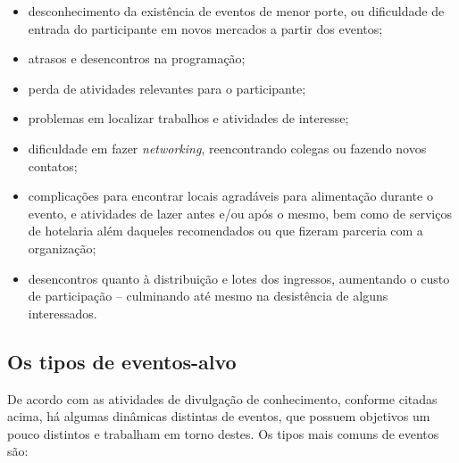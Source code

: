 \documentclass[12pt,a4paper,twoside,hyphens,english,brazil]{abntex2}
\begin{document}
\begin{itemize}[itemsep=-1ex]
	\item desconhecimento da existência de eventos de menor porte, ou dificuldade de entrada do participante em novos mercados a partir dos eventos;
	\item atrasos e desencontros na programação;
	\item perda de atividades relevantes para o participante;
	\item problemas em localizar trabalhos e atividades de interesse;
	\item dificuldade em fazer \emph{networking}, reencontrando colegas ou fazendo novos contatos;
	\item complicações para encontrar locais agradáveis para alimentação durante o evento, e atividades de lazer antes e/ou após o mesmo, bem como de serviços de hotelaria além daqueles recomendados ou que fizeram parceria com a organização;
	\item desencontros quanto \`a distribuição e lotes dos ingressos, aumentando o custo de participação -- culminando até mesmo na desistência de alguns interessados.
\end{itemize}

\subsection{Os tipos de eventos-alvo} \label{sec:eventos}
De acordo com as atividades de divulgação de conhecimento, conforme citadas acima, há algumas dinâmicas distintas de eventos, que possuem objetivos um pouco distintos e trabalham em torno destes. Os tipos mais comuns de eventos são\cite{tipos-manager}\cite{tipos-parlante}\cite{dicionario}\cite{dicas-feira-de-negocios}:
\end{document}
